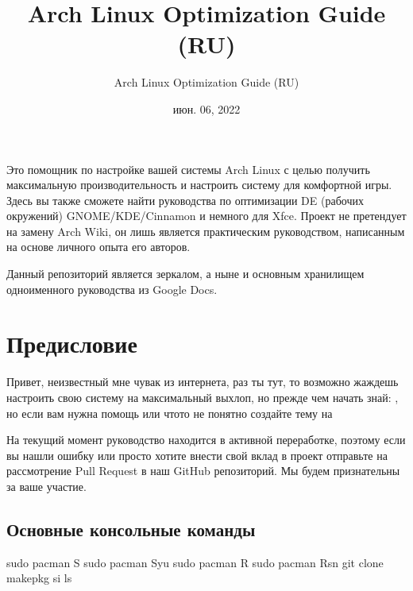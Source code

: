 \documentclass[letterpaper,10pt,russian,openany]{sphinxmanual}
\title{Arch Linux Optimization Guide (RU)}
\date{июн. 06, 2022}
\author{Arch Linux Optimization Guide (RU)}
\begin{document}
\pagestyle{empty}
\sphinxmaketitle
\pagestyle{plain}
\sphinxtableofcontents
\pagestyle{normal}
\label{\detokenize{index::doc}}


\sphinxAtStartPar
Это помощник по настройке вашей системы Arch Linux с целью получить максимальную производительность и настроить систему для комфортной игры.
Здесь вы также сможете найти руководства по оптимизации DE (рабочих окружений) GNOME/KDE/Cinnamon и немного для Xfce.
Проект не претендует на замену Arch Wiki, он лишь является практическим руководством, написанным на основе личного опыта его авторов.

\sphinxAtStartPar
Данный репозиторий является зеркалом, а ныне и основным хранилищем одноименного руководства из Google Docs.

\sphinxstepscope


\chapter{Предисловие}
\label{\detokenize{source/preface:preface}}\label{\detokenize{source/preface:id1}}\label{\detokenize{source/preface::doc}}
\sphinxAtStartPar
Привет, неизвестный мне чувак из интернета, раз ты тут,
то возможно жаждешь настроить свою систему на максимальный выхлоп, но прежде чем начать \sphinxhyphen{} знай:
,
но если вам нужна помощь или что\sphinxhyphen{}то не понятно  \sphinxhyphen{} создайте тему на 

\sphinxAtStartPar
На текущий момент руководство находится в активной переработке,
поэтому если вы нашли ошибку или просто хотите внести свой вклад в проект \sphinxhyphen{} отправьте на рассмотрение Pull Request в наш GitHub репозиторий.
Мы будем признательны за ваше участие.

\ignorespaces 

\section{Основные консольные команды}
\label{\detokenize{source/preface:basic-commands}}\label{\detokenize{source/preface:index-0}}\label{\detokenize{source/preface:id2}}
\begin{sphinxVerbatim}[commandchars=\\\{\}]
sudo pacman \PYGZhy{}S    
sudo pacman \PYGZhy{}Syu  
sudo pacman \PYGZhy{}R    
sudo pacman \PYGZhy{}Rsn  
git clone         
makepkg \PYGZhy{}si       
                
ls                
\end{sphinxVerbatim}
\end{document}

